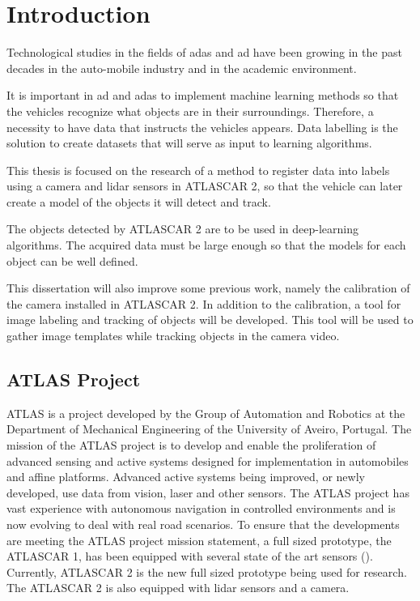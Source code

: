 \chapter{Introduction}
Technological studies in the fields of \gls{adas} and \gls{ad} have been growing in the past decades in the auto-mobile industry and in the academic environment. 

It is important in \gls{ad} and \gls{adas} to implement machine learning methods so that the vehicles recognize what objects are in their surroundings. Therefore, a necessity to have data that instructs the vehicles appears. Data labelling is the solution to create datasets that will serve as input to learning algorithms.

This thesis is focused on the research of a method to register data into labels using a camera and \gls{lidar} sensors in ATLASCAR 2, so that the vehicle can later create a model of the objects it will detect and track.

The objects detected by ATLASCAR 2 are to be used in deep-learning algorithms. The acquired data must be large enough so that the models for each object can be well defined.

This dissertation will also improve some previous work, namely the calibration of the camera installed in ATLASCAR 2. In addition to the calibration, a tool for image labeling and tracking of objects will be developed. This tool will be used to gather image templates while tracking objects in the camera video. 

\section{ATLAS Project}

ATLAS is a project developed by the Group of Automation and Robotics at the Department of Mechanical Engineering of the University of Aveiro, Portugal. The mission of the ATLAS project is to develop and enable the proliferation of advanced sensing and active systems designed for implementation in automobiles and affine platforms. Advanced active systems being improved, or newly developed, use data from vision, laser and other sensors. The ATLAS project has vast experience with autonomous navigation in controlled environments and is now evolving to deal with real road scenarios. To ensure that the developments are meeting the ATLAS project mission statement, a full sized prototype, the ATLASCAR 1, has been equipped with several state of the art sensors (\cite{LARlabs}). Currently, ATLASCAR 2 is the new full sized prototype being used for research. The ATLASCAR 2 is also equipped with \gls{lidar} sensors and a camera.

